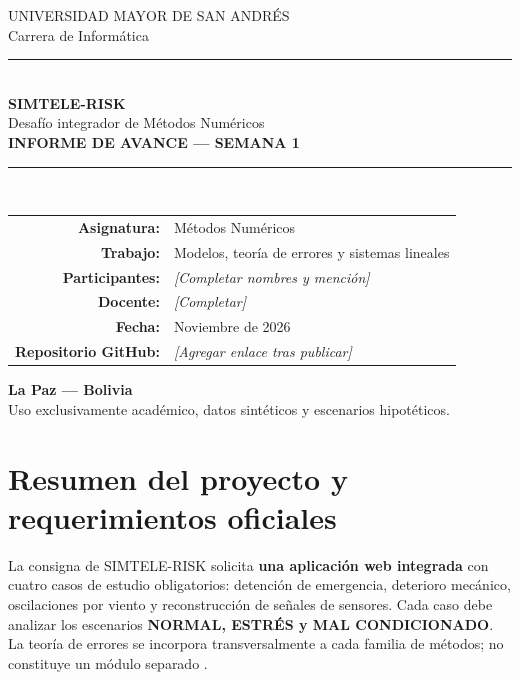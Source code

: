 \documentclass[letterpaper,11pt]{article}
\begin{document}
\begin{titlepage}
\begin{center}
\vspace*{1.8cm}
{\Large UNIVERSIDAD MAYOR DE SAN ANDRÉS}\\[0.3cm]
{\large Carrera de Informática}\\[1.4cm]
{\color{turquesa}\rule{0.83\textwidth}{1.5pt}}\\[0.8cm]
{\Huge\bfseries SIMTELE-RISK}\\[0.2cm]
{\LARGE Desafío integrador de Métodos Numéricos}\\[0.5cm]
{\Large\bfseries INFORME DE AVANCE — SEMANA 1}\\[0.5cm]
{\color{turquesa}\rule{0.83\textwidth}{1.5pt}}\\[1.6cm]
\begin{tabular}{rl}
\textbf{Asignatura:} & Métodos Numéricos \\
\textbf{Trabajo:} & Modelos, teoría de errores y sistemas lineales \\
\textbf{Participantes:} & \textit{[Completar nombres y mención]} \\
\textbf{Docente:} & \textit{[Completar]} \\
\textbf{Fecha:} & Noviembre de 2026 \\
\textbf{Repositorio GitHub:} & \textit{[Agregar enlace tras publicar]} \\
\end{tabular}
\vfill
\textbf{La Paz — Bolivia}\\[0.2cm]
{\small Uso exclusivamente académico, datos sintéticos y escenarios hipotéticos.}
\end{center}
\end{titlepage}
\tableofcontents\clearpage

\section{Resumen del proyecto y requerimientos oficiales}
La consigna de SIMTELE-RISK solicita \textbf{una aplicación web integrada} con cuatro casos de estudio obligatorios: detención de emergencia, deterioro mecánico, oscilaciones por viento y reconstrucción de señales de sensores. Cada caso debe analizar los escenarios \textbf{NORMAL, ESTRÉS y MAL CONDICIONADO}. La teoría de errores se incorpora transversalmente a cada familia de métodos; no constituye un módulo separado \cite{consigna}.
\end{document}
